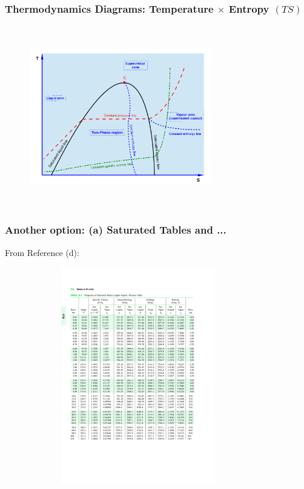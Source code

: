 \documentclass[10pt,compress,handout,ignorenonframetext]{beamer}
\begin{document}
\begin{frame}
 \frametitle{Thermodynamics Diagrams: Temperature $\times$ Entropy $(TS)$}
  \begin{center}
   \begin{figure}
      \includegraphics[width=8cm,height=7.9cm,clip]{./Pics/TS_Diag_Schematics}
   \end{figure}
   \end{center}
\end{frame}

\begin{frame}
  \frametitle{Another option: (a) Saturated Tables and ...}
\scriptsize{From Reference (d):}\vspace{-.8cm}
   \begin{center}
   \begin{figure}
      \includegraphics[width=9.5cm,height=9.5cm,clip]{./Pics/WaterSatTable}
   \end{figure}
   \end{center}
\end{frame}
\end{document}
